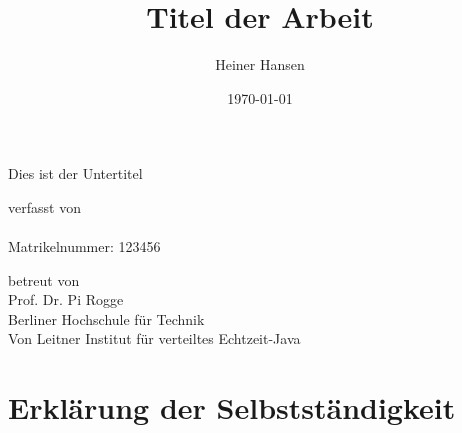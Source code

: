 \documentclass[a4paper, 11pt]{article}
\title{Titel der Arbeit}
\author{Heiner Hansen}
\date{\today}
\begin{document}
\begin{titlepage}
    \begin{center}
        \vspace*{1cm}
        \Huge
        \textbf{\thetitle}
        
        \vspace{0.5cm}
        \LARGE
        Dies ist der Untertitel
        
        \vspace{1.5cm}
        
        \Large
        verfasst von \\
        \theauthor \\
        Matrikelnummer: 123456
        
        \vfill
        
        betreut von \\
        Prof. Dr. Pi Rogge \\
        Berliner Hochschule für Technik \\
        Von Leitner Institut für verteiltes Echtzeit-Java
        
        \vspace{1.5cm}
        
        \Large
        \thedate
        
    \end{center}
\end{titlepage}

\tableofcontents
\newpage

\listoffigures
\listoftables
\newpage

\printnoidxglossary[type=\acronymtype,title=Abkürzungsverzeichnis]
\newpage



\setcounter{page}{1}




\medskip
\newpage

\newpage
\printbibliography[]
\newpage

\section*{Erklärung der Selbstständigkeit}
\end{document}
